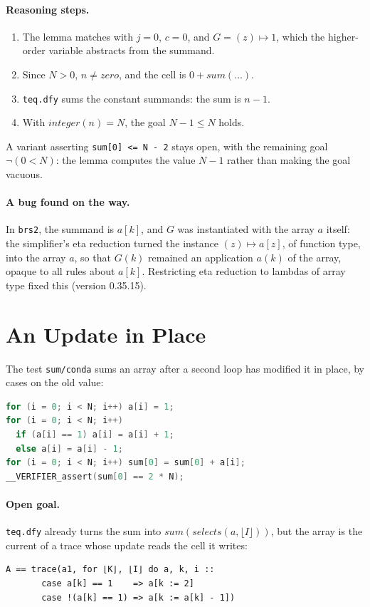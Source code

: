 \documentclass[sigconf,nonacm]{acmart}
\newcommand{\code}[1]{\texttt{#1}}
\begin{document}
\paragraph{Reasoning steps.}
\begin{enumerate}
\item The lemma matches with $j = 0$, $c = 0$, and $G = (z) \mapsto 1$,
  which the higher-order variable abstracts from the summand.
\item Since $N > 0$, $n \neq \mathit{zero}$, and the cell is
  $0 + \mathit{sum}(\ldots)$.
\item \code{teq.dfy} sums the constant summands: the sum is $n - 1$.
\item With $\mathit{integer}(n) = N$, the goal $N - 1 \le N$ holds.
\end{enumerate}
A variant asserting \code{sum[0] <= N - 2} stays open, with the remaining goal
$\neg(0 < N)$: the lemma computes the value $N - 1$ rather than making the
goal vacuous.

\paragraph{A bug found on the way.} In \code{brs2}, the summand is $a[k]$,
and $G$ was instantiated with the array $a$ itself: the simplifier's eta
reduction turned the instance $(z) \mapsto a[z]$, of function type, into the
array $a$, so that $G(k)$ remained an application $a(k)$ of the array, opaque
to all rules about $a[k]$. Restricting eta reduction to lambdas of array type
fixed this (version 0.35.15).

\section{An Update in Place}

The test \code{sum/conda} sums an array after a second loop has modified it
in place, by cases on the old value:
\begin{lstlisting}[language=C]
for (i = 0; i < N; i++) a[i] = 1;
for (i = 0; i < N; i++)
  if (a[i] == 1) a[i] = a[i] + 1;
  else a[i] = a[i] - 1;
for (i = 0; i < N; i++) sum[0] = sum[0] + a[i];
__VERIFIER_assert(sum[0] == 2 * N);
\end{lstlisting}

\paragraph{Open goal.} \code{teq.dfy} already turns the sum into
$\mathit{sum}(\mathit{selects}(a, \lfloor I\rfloor))$, but the array is the
current of a trace whose update reads the cell it writes:
\begin{lstlisting}[language=goal]
A == trace(a1, for ⌊K⌋, ⌊I⌋ do a, k, i ::
       case a[k] == 1    => a[k := 2]
       case !(a[k] == 1) => a[k := a[k] - 1])
\end{lstlisting}
\end{document}
